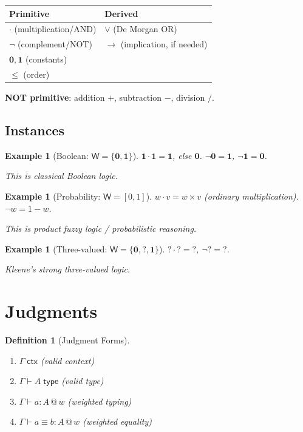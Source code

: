 \documentclass[11pt,a4paper]{article}
\makeatletter
\newtheorem{definition}{Definition}[section]
\newtheorem{example}[theorem]{Example}
\newcommand{\W}{\mathsf{W}}
\newcommand{\ctx}{\;\mathsf{ctx}}
\newcommand{\type}{\;\mathsf{type}}
\newcommand{\at}[1]{\,@\,#1}
\newcommand{\one}{\mathbf{1}}
\newcommand{\zero}{\mathbf{0}}
\newcommand{\negw}{\neg}
\makeatother
\begin{document}
\begin{center}
\begin{tabular}{l|l}
\textbf{Primitive} & \textbf{Derived} \\
\hline
$\cdot$ (multiplication/AND) & $\vee$ (De Morgan OR) \\
$\negw$ (complement/NOT) & $\to$ (implication, if needed) \\
$\zero, \one$ (constants) & \\
$\leq$ (order) &
\end{tabular}
\end{center}

\textbf{NOT primitive}: addition $+$, subtraction $-$, division $/$.

\subsection{Instances}

\begin{example}[Boolean: $\W = \{\zero, \one\}$]
$\one \cdot \one = \one$, else $\zero$. $\negw \zero = \one$, $\negw \one = \zero$.

This is classical Boolean logic.
\end{example}

\begin{example}[Probability: $\W = {[0,1]}$]
$w \cdot v = w \times v$ (ordinary multiplication). $\negw w = 1 - w$.

This is product fuzzy logic / probabilistic reasoning.
\end{example}

\begin{example}[Three-valued: $\W = \{\zero, ?, \one\}$]
$? \cdot ? = ?$, $\negw ? = ?$.

Kleene's strong three-valued logic.
\end{example}

\section{Judgments}

\begin{definition}[Judgment Forms]
\begin{enumerate}
    \item $\Gamma \ctx$ \hfill (valid context)
    \item $\Gamma \vdash A \type$ \hfill (valid type)
    \item $\Gamma \vdash a : A \at{w}$ \hfill (weighted typing)
    \item $\Gamma \vdash a \equiv b : A \at{w}$ \hfill (weighted equality)
\end{enumerate}
\end{definition}
\end{document}

